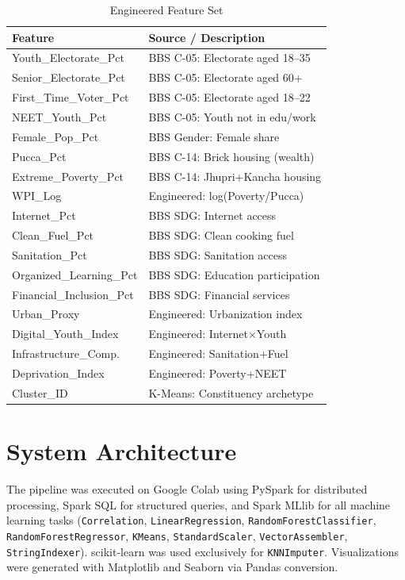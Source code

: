 \documentclass[conference]{IEEEtran}
\begin{document}
\begin{table}[t]
\centering
\caption{Engineered Feature Set}
\label{tab:features}
\footnotesize
\begin{tabular}{l l}
\toprule
\textbf{Feature} & \textbf{Source / Description} \\
\midrule
Youth\_Electorate\_Pct & BBS C-05: Electorate aged 18--35 \\
Senior\_Electorate\_Pct & BBS C-05: Electorate aged 60+ \\
First\_Time\_Voter\_Pct & BBS C-05: Electorate aged 18--22 \\
NEET\_Youth\_Pct & BBS C-05: Youth not in edu/work \\
Female\_Pop\_Pct & BBS Gender: Female share \\
Pucca\_Pct & BBS C-14: Brick housing (wealth) \\
Extreme\_Poverty\_Pct & BBS C-14: Jhupri+Kancha housing \\
WPI\_Log & Engineered: log(Poverty/Pucca) \\
Internet\_Pct & BBS SDG: Internet access \\
Clean\_Fuel\_Pct & BBS SDG: Clean cooking fuel \\
Sanitation\_Pct & BBS SDG: Sanitation access \\
Organized\_Learning\_Pct & BBS SDG: Education participation \\
Financial\_Inclusion\_Pct & BBS SDG: Financial services \\
Urban\_Proxy & Engineered: Urbanization index \\
Digital\_Youth\_Index & Engineered: Internet$\times$Youth \\
Infrastructure\_Comp. & Engineered: Sanitation+Fuel \\
Deprivation\_Index & Engineered: Poverty+NEET \\
Cluster\_ID & K-Means: Constituency archetype \\
\bottomrule
\end{tabular}
\end{table}

\section{System Architecture}

The pipeline was executed on Google Colab using PySpark for distributed processing, Spark SQL for structured queries, and Spark MLlib for all machine learning tasks (\texttt{Correlation}, \texttt{LinearRegression}, \texttt{RandomForestClassifier}, \texttt{RandomForestRegressor}, \texttt{KMeans}, \texttt{StandardScaler}, \texttt{VectorAssembler}, \texttt{StringIndexer}). scikit-learn was used exclusively for \texttt{KNNImputer}. Visualizations were generated with Matplotlib and Seaborn via Pandas conversion.
\end{document}

